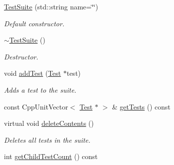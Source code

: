 \begin{DoxyCompactItemize}
\item 
\hyperlink{class_test_suite_a79810fbb94c672e1a25540aabcab6b9b}{Test\+Suite} (std\+::string name=\char`\"{}\char`\"{})
\begin{DoxyCompactList}\small\item\em Default constructor. \end{DoxyCompactList}\item 
\hypertarget{class_test_suite_a1a4603e985169c62d251876dd3910b5e}{\hyperlink{class_test_suite_a1a4603e985169c62d251876dd3910b5e}{$\sim$\+Test\+Suite} ()}\label{class_test_suite_a1a4603e985169c62d251876dd3910b5e}

\begin{DoxyCompactList}\small\item\em Destructor. \end{DoxyCompactList}\item 
void \hyperlink{class_test_suite_a8cd9628eee382a9670076765ec25cfa8}{add\+Test} (\hyperlink{class_test}{Test} $\ast$test)
\begin{DoxyCompactList}\small\item\em Adds a test to the suite. \end{DoxyCompactList}\item 
const Cpp\+Unit\+Vector$<$ \hyperlink{class_test}{Test} $\ast$ $>$ \& \hyperlink{class_test_suite_a3205640eefd9694b2a7f2f2ec058af50}{get\+Tests} () const 
\item 
virtual void \hyperlink{class_test_suite_a6901d813932cf2919c20ca55bb922dae}{delete\+Contents} ()
\begin{DoxyCompactList}\small\item\em Deletes all tests in the suite. \end{DoxyCompactList}\item 
\hypertarget{class_test_suite_aeaabfd3afef12412cd390b90128a7d87}{int \hyperlink{class_test_suite_aeaabfd3afef12412cd390b90128a7d87}{get\+Child\+Test\+Count} () const }\label{class_test_suite_aeaabfd3afef12412cd390b90128a7d87}


\end{DoxyCompactItemize}
